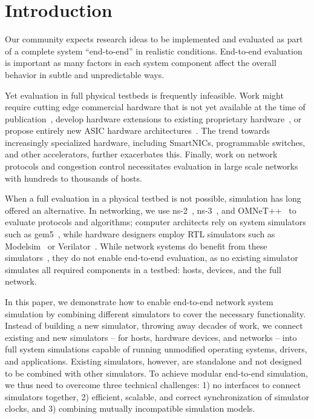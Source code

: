 \section{Introduction}
Our community expects research ideas to be implemented and evaluated as part of
a complete system ``end-to-end'' in realistic conditions.
%
End-to-end evaluation is important as many factors in each system component
affect the overall behavior in subtle and unpredictable ways.


Yet evaluation in full physical testbeds is frequently infeasible.
%
Work might require cutting edge commercial hardware that is not yet
available at the time of
publication~\cite{sharma:flexswitch,liu:incbricks,li:nopaxos,eris},
develop hardware extensions to existing proprietary
hardware~\cite{sharma:afq}, or propose entirely new ASIC hardware
architectures~\cite{bosshart:rmt,chole:drmt,sivaraman:packet_transactions,
sutherland:nebula,kaufmann:flexnic,jouppi:tpu,magaki:asic_clouds,
lin:panic}.
%
The trend towards increasingly specialized hardware, including
SmartNICs, programmable switches, and other accelerators, further
exacerbates this.
%
Finally, work on network protocols and congestion control necessitates
evaluation in large scale networks with hundreds to thousands of hosts.


When a full evaluation in a physical testbed is not possible,
simulation has long offered an alternative.
%
In networking, we use ns-2~\cite{software:ns2},
ns-3~\cite{software:ns3}, and OMNeT++~\cite{varga:omnetpp} to evaluate
protocols and algorithms;
computer architects rely on system simulators such as
gem5~\cite{binkert:gem5},
while hardware designers employ RTL simulators such as
Modelsim~\cite{software:modelsim} or
Verilator~\cite{software:verilator}.
%
While network systems do benefit from these
simulators~\cite{arashloo:tonic,mittal:irn,kaufmann:tas}, they do not
enable end-to-end evaluation, as no existing simulator simulates all
required components in a testbed: hosts, devices, and the full network.

In this paper, we demonstrate how to enable end-to-end network system simulation
by combining different simulators to cover the necessary functionality.
%
Instead of building a new simulator, throwing away decades of work, we connect
existing and new simulators -- for hosts, hardware devices, and networks -- into
full system simulations capable of running unmodified operating systems,
drivers, and applications.
%
Existing simulators, however, are standalone and not designed to be
combined with other simulators.
%
To achieve modular end-to-end simulation, we thus need to overcome
three technical challenges:
1) no interfaces to connect simulators together,
2) efficient, scalable, and correct synchronization of simulator clocks, and
3) combining mutually incompatible simulation models.


